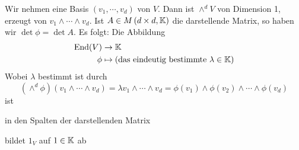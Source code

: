 \begin{Bew}
  Wir nehmen eine Basis $\left( v_1,\cdots,v_d \right)$ von $V$.  Dann ist $\wedge^dV$ von Dimension 1, erzeugt von $v_1\wedge\cdots\wedge v_d$. Ist $A\in M\left( d\times d,\mathbb{K} \right)$ die darstellende Matrix, so haben wir $\det\phi=\det A$. Es folgt: Die Abbildung
  \begin{align*}
    \Endo(V)&\to \mb{K}\\
    \phi&\mapsto\left( \text{das eindeutig bestimmte} \ \lambda\in\mb{K} \right)
  \end{align*}
  Wobei $\lambda$ bestimmt ist durch
  \[\left( \wedge^d\phi \right)\left( v_1\wedge\cdots\wedge v_d \right)=\lambda v_1\wedge\cdots\wedge v_d = \phi\left( v_1 \right)\wedge\phi(v_2)\wedge\cdots\wedge\phi(v_d)\]
  ist 
  \begin{description}
    \item[multilinear] in den Spalten der darstellenden Matrix
    \item[alternierend]
    \item bildet $1_V$ auf $1\in\mathbb{K}$ ab
  \end{description}
\end{Bew}
